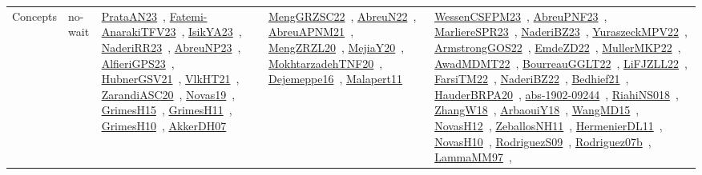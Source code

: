 {\begin{longtable}{lp{3cm}>{\raggedright\arraybackslash}p{6cm}>{\raggedright\arraybackslash}p{6cm}>{\raggedright\arraybackslash}p{8cm}}
\index{no-wait}\index{Concepts!no-wait}Concepts & no-wait & \href{../works/PrataAN23.pdf}{PrataAN23}~\cite{PrataAN23}, \href{../works/Fatemi-AnarakiTFV23.pdf}{Fatemi-AnarakiTFV23}~\cite{Fatemi-AnarakiTFV23}, \href{../works/IsikYA23.pdf}{IsikYA23}~\cite{IsikYA23}, \href{../works/NaderiRR23.pdf}{NaderiRR23}~\cite{NaderiRR23}, \href{../works/AbreuNP23.pdf}{AbreuNP23}~\cite{AbreuNP23}, \href{../works/AlfieriGPS23.pdf}{AlfieriGPS23}~\cite{AlfieriGPS23}, \href{../works/HubnerGSV21.pdf}{HubnerGSV21}~\cite{HubnerGSV21}, \href{../works/VlkHT21.pdf}{VlkHT21}~\cite{VlkHT21}, \href{../works/ZarandiASC20.pdf}{ZarandiASC20}~\cite{ZarandiASC20}, \href{../works/Novas19.pdf}{Novas19}~\cite{Novas19}, \href{../works/GrimesH15.pdf}{GrimesH15}~\cite{GrimesH15}, \href{../works/GrimesH11.pdf}{GrimesH11}~\cite{GrimesH11}, \href{../works/GrimesH10.pdf}{GrimesH10}~\cite{GrimesH10}, \href{../works/AkkerDH07.pdf}{AkkerDH07}~\cite{AkkerDH07} & \href{../works/MengGRZSC22.pdf}{MengGRZSC22}~\cite{MengGRZSC22}, \href{../works/AbreuN22.pdf}{AbreuN22}~\cite{AbreuN22}, \href{../works/AbreuAPNM21.pdf}{AbreuAPNM21}~\cite{AbreuAPNM21}, \href{../works/MengZRZL20.pdf}{MengZRZL20}~\cite{MengZRZL20}, \href{../works/MejiaY20.pdf}{MejiaY20}~\cite{MejiaY20}, \href{../works/MokhtarzadehTNF20.pdf}{MokhtarzadehTNF20}~\cite{MokhtarzadehTNF20}, \href{../works/Dejemeppe16.pdf}{Dejemeppe16}~\cite{Dejemeppe16}, \href{../works/Malapert11.pdf}{Malapert11}~\cite{Malapert11} & \href{../works/WessenCSFPM23.pdf}{WessenCSFPM23}~\cite{WessenCSFPM23}, \href{../works/AbreuPNF23.pdf}{AbreuPNF23}~\cite{AbreuPNF23}, \href{../works/MarliereSPR23.pdf}{MarliereSPR23}~\cite{MarliereSPR23}, \href{../works/NaderiBZ23.pdf}{NaderiBZ23}~\cite{NaderiBZ23}, \href{../works/YuraszeckMPV22.pdf}{YuraszeckMPV22}~\cite{YuraszeckMPV22}, \href{../works/ArmstrongGOS22.pdf}{ArmstrongGOS22}~\cite{ArmstrongGOS22}, \href{../works/EmdeZD22.pdf}{EmdeZD22}~\cite{EmdeZD22}, \href{../works/MullerMKP22.pdf}{MullerMKP22}~\cite{MullerMKP22}, \href{../works/AwadMDMT22.pdf}{AwadMDMT22}~\cite{AwadMDMT22}, \href{../works/BourreauGGLT22.pdf}{BourreauGGLT22}~\cite{BourreauGGLT22}, \href{../works/LiFJZLL22.pdf}{LiFJZLL22}~\cite{LiFJZLL22}, \href{../works/FarsiTM22.pdf}{FarsiTM22}~\cite{FarsiTM22}, \href{../works/NaderiBZ22.pdf}{NaderiBZ22}~\cite{NaderiBZ22}, \href{../works/Bedhief21.pdf}{Bedhief21}~\cite{Bedhief21}, \href{../works/HauderBRPA20.pdf}{HauderBRPA20}~\cite{HauderBRPA20}, \href{../works/abs-1902-09244.pdf}{abs-1902-09244}~\cite{abs-1902-09244}, \href{../works/RiahiNS018.pdf}{RiahiNS018}~\cite{RiahiNS018}, \href{../works/ZhangW18.pdf}{ZhangW18}~\cite{ZhangW18}, \href{../works/ArbaouiY18.pdf}{ArbaouiY18}~\cite{ArbaouiY18}, \href{../works/WangMD15.pdf}{WangMD15}~\cite{WangMD15}, \href{../works/NovasH12.pdf}{NovasH12}~\cite{NovasH12}, \href{../works/ZeballosNH11.pdf}{ZeballosNH11}~\cite{ZeballosNH11}, \href{../works/HermenierDL11.pdf}{HermenierDL11}~\cite{HermenierDL11}, \href{../works/NovasH10.pdf}{NovasH10}~\cite{NovasH10}, \href{../works/RodriguezS09.pdf}{RodriguezS09}~\cite{RodriguezS09}, \href{../works/Rodriguez07b.pdf}{Rodriguez07b}~\cite{Rodriguez07b}, \href{../works/LammaMM97.pdf}{LammaMM97}~\cite{LammaMM97}, 
\end{longtable}}
